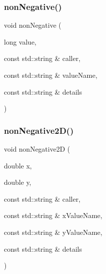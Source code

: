 \mbox{\label{namespacerequire_ab6ae8c9103d53e949d404cd5a183fca5}} 
\subsubsection{\texorpdfstring{non\+Negative()}{nonNegative()}\hspace{0.1cm}{\footnotesize\ttfamily [3/3]}}
{\footnotesize\ttfamily void non\+Negative (\begin{DoxyParamCaption}\item[{long}]{value,  }\item[{const std\+::string \&}]{caller,  }\item[{const std\+::string \&}]{value\+Name,  }\item[{const std\+::string \&}]{details }\end{DoxyParamCaption})}

\mbox{\label{namespacerequire_a2214293651f178b5b1f1a286537328bf}} 
\subsubsection{\texorpdfstring{non\+Negative2\+D()}{nonNegative2D()}\hspace{0.1cm}{\footnotesize\ttfamily [1/2]}}
{\footnotesize\ttfamily void non\+Negative2D (\begin{DoxyParamCaption}\item[{double}]{x,  }\item[{double}]{y,  }\item[{const std\+::string \&}]{caller,  }\item[{const std\+::string \&}]{x\+Value\+Name,  }\item[{const std\+::string \&}]{y\+Value\+Name,  }\item[{const std\+::string \&}]{details }\end{DoxyParamCaption})}

\mbox{\label{namespacerequire_ad0791f9f281c785969854c26f3506ac4}} 
